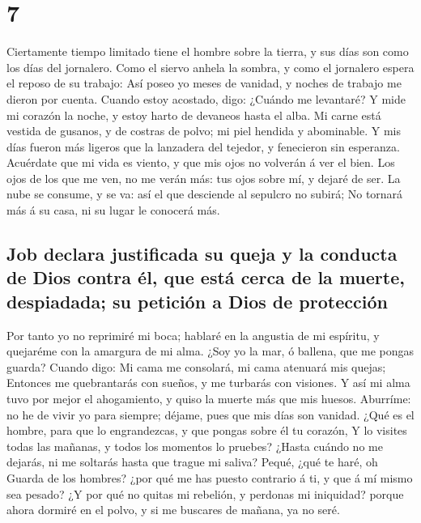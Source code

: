 \hypertarget{section-6}{%
\section{7}\label{section-6}}

 Ciertamente tiempo limitado tiene el hombre sobre la
tierra, y sus días son como los días del jornalero.  Como
el siervo anhela la sombra, y como el jornalero espera el reposo de su
trabajo:  Así poseo yo meses de vanidad, y noches de
trabajo me dieron por cuenta.  Cuando estoy acostado,
digo: ¿Cuándo me levantaré? Y mide mi corazón la noche, y estoy harto de
devaneos hasta el alba.  Mi carne está vestida de gusanos,
y de costras de polvo; mi piel hendida y abominable.  Y
mis días fueron más ligeros que la lanzadera del tejedor, y fenecieron
sin esperanza.  Acuérdate que mi vida es viento, y que mis
ojos no volverán á ver el bien.  Los ojos de los que me
ven, no me verán más: tus ojos sobre mí, y dejaré de ser. 
La nube se consume, y se va: así el que desciende al sepulcro no subirá;
 No tornará más á su casa, ni su lugar le conocerá más.

\hypertarget{job-declara-justificada-su-queja-y-la-conducta-de-dios-contra-uxe9l-que-estuxe1-cerca-de-la-muerte-despiadada-su-peticiuxf3n-a-dios-de-protecciuxf3n}{%
\subsection{Job declara justificada su queja y la conducta de Dios
contra él, que está cerca de la muerte, despiadada; su petición a Dios
de
protección}\label{job-declara-justificada-su-queja-y-la-conducta-de-dios-contra-uxe9l-que-estuxe1-cerca-de-la-muerte-despiadada-su-peticiuxf3n-a-dios-de-protecciuxf3n}}

 Por tanto yo no reprimiré mi boca; hablaré en la
angustia de mi espíritu, y quejaréme con la amargura de mi alma.
 ¿Soy yo la mar, ó ballena, que me pongas guarda?
 Cuando digo: Mi cama me consolará, mi cama atenuará mis
quejas;  Entonces me quebrantarás con sueños, y me
turbarás con visiones.  Y así mi alma tuvo por mejor el
ahogamiento, y quiso la muerte más que mis huesos. 
Aburríme: no he de vivir yo para siempre; déjame, pues que mis días son
vanidad.  ¿Qué es el hombre, para que lo engrandezcas, y
que pongas sobre él tu corazón,  Y lo visites todas las
mañanas, y todos los momentos lo pruebes?  ¿Hasta cuándo
no me dejarás, ni me soltarás hasta que trague mi saliva?
 Pequé, ¿qué te haré, oh Guarda de los hombres? ¿por qué
me has puesto contrario á ti, y que á mí mismo sea pesado?
 ¿Y por qué no quitas mi rebelión, y perdonas mi
iniquidad? porque ahora dormiré en el polvo, y si me buscares de mañana,
ya no seré.

